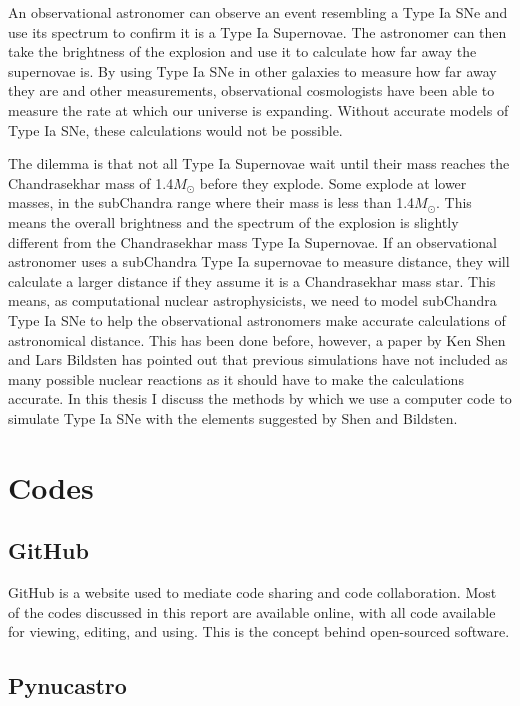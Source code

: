 \documentclass[11pt, oneside]{article}   	%
\begin{document}
  An observational astronomer can observe an event resembling a Type Ia SNe and use its spectrum to confirm it is a Type Ia Supernovae. The astronomer can then take the brightness of the explosion and use it to calculate how far away the supernovae is. By using Type Ia SNe in other galaxies to measure how far away they are and other measurements, observational cosmologists have been able to measure the rate at which our universe is expanding. Without accurate models of Type Ia SNe, these calculations would not be possible. 
  
  The dilemma is that not all Type Ia Supernovae wait until their mass reaches  the Chandrasekhar mass of 1.4$M_{\odot}$ before they explode. Some explode at lower masses, in the subChandra range where their mass is less than 1.4$M_{\odot}$. This means the overall brightness and the spectrum of the explosion is slightly different from the Chandrasekhar mass Type Ia Supernovae. If an observational astronomer uses a subChandra Type Ia supernovae to measure distance, they will calculate a larger distance if they assume it is a Chandrasekhar mass star. This means, as computational nuclear astrophysicists, we need to model subChandra Type Ia SNe to help the observational astronomers make accurate calculations of astronomical distance. This has been done before, however, a paper by Ken Shen and Lars Bildsten has pointed out that previous simulations have not included as many possible nuclear reactions as it should have to make the calculations accurate. In this thesis I discuss the methods by which we use a computer code to simulate Type Ia SNe with the elements suggested by Shen and Bildsten. 

\section{Codes}

  \subsection{GitHub}
  	
    GitHub is a website used to mediate code sharing and code collaboration. Most of the codes discussed in this report are available online, with all code available for viewing, editing, and using. This is the concept behind open-sourced software. 

  \subsection{Pynucastro}
    
\end{document}

